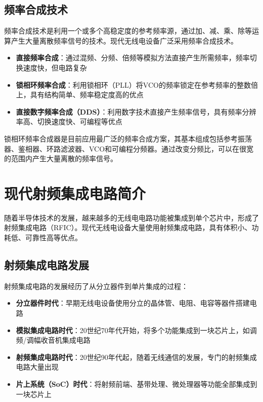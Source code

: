 \documentclass[12pt,UTF8]{ctexbook}
\begin{document}
\subsection{频率合成技术}

频率合成技术是利用一个或多个高稳定度的参考频率源，通过加、减、乘、除等运算产生大量离散频率信号的技术。现代无线电设备广泛采用频率合成技术。

\begin{itemize}[leftmargin=3.5em]
    \item \textbf{直接频率合成}：通过混频、分频、倍频等模拟方法直接产生所需频率，频率切换速度快，但电路复杂
    \item \textbf{锁相环频率合成}：利用锁相环（PLL）将VCO的频率锁定在参考频率的整数倍上，具有结构简单、频率稳定度高的优点
    \item \textbf{直接数字频率合成（DDS）}：利用数字技术直接产生频率信号，具有频率分辨率高、切换速度快、可编程等优点
\end{itemize}

锁相环频率合成器是目前应用最广泛的频率合成方案，其基本组成包括参考振荡器、鉴相器、环路滤波器、VCO和可编程分频器。通过改变分频比，可以在很宽的范围内产生大量离散的频率信号。

\section{现代射频集成电路简介}

随着半导体技术的发展，越来越多的无线电电路功能被集成到单个芯片中，形成了射频集成电路（RFIC）。现代无线电设备大量使用射频集成电路，具有体积小、功耗低、可靠性高等优点。

\subsection{射频集成电路发展}

射频集成电路的发展经历了从分立器件到单片集成的过程：

\begin{itemize}[leftmargin=3.5em]
    \item \textbf{分立器件时代}：早期无线电设备使用分立的晶体管、电阻、电容等器件搭建电路
    \item \textbf{模拟集成电路时代}：20世纪70年代开始，将多个功能集成到一块芯片上，如调频/调幅收音机集成电路
    \item \textbf{射频集成电路时代}：20世纪90年代起，随着无线通信的发展，专门的射频集成电路大量出现
    \item \textbf{片上系统（SoC）时代}：将射频前端、基带处理、微处理器等功能全部集成到一块芯片上
\end{itemize}
\end{document}
